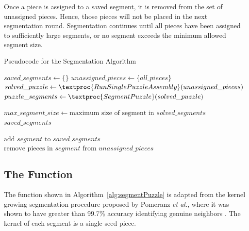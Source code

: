 Once a piece is assigned to a saved segment, it is removed from the set of unassigned pieces.  Hence, those pieces will not be placed in the next segmentation round.  Segmentation continues until all pieces have been assigned to sufficiently large segments, or no segment exceeds the minimum allowed segment size.

\begin{algorithm}[tb]
\caption{Pseudocode for the Segmentation Algorithm}\label{alg:segmentation}
\begin{algorithmic}[1]
    \State $saved\_segments \gets \{ \}$
    \State $unassigned\_pieces \gets \{ all\_pieces \}$
    \Loop
        \State $solved\_puzzle \gets \textproc{RunSinglePuzzleAssembly}(unassigned\_pieces)$
        \State $puzzle\_segments \gets \textproc{SegmentPuzzle}(solved\_puzzle)$
\item[]
        \State $max\_segment\_size \gets \text{maximum size of segment in } solved\_segments$
			\State \Return $saved\_segments$
        \EndIf
\item[]
                \State $\text{add } segment \text{ to } saved\_segments$
                \State $\text{remove pieces in } segment \text{ from } unassigned\_pieces$
            \EndIf
        \EndFor
	\EndLoop
\EndFunction
\end{algorithmic}
\end{algorithm}

\subsection{The  Function}\label{sec:segmentPuzzle}

The  function shown in Algorithm~\ref{alg:segmentPuzzle} is adapted from the kernel growing segmentation procedure proposed by Pomeranz \textit{et al.}, where it was shown to have greater than 99.7\% accuracy identifying genuine neighbors \cite{pomeranz2011}. The kernel of each segment is a single seed piece.

